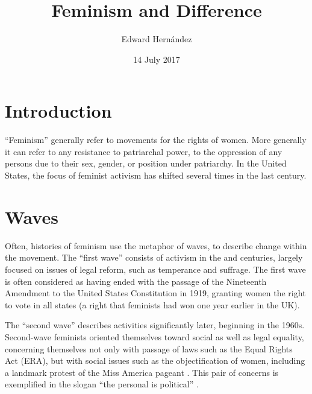 \documentclass[man,12pt,natbib]{apa6}
\begin{document}
\title{Feminism and Difference}
\author{Edward Hern\'{a}ndez}
\date{14 July 2017}
\maketitle

%
%

\section{Introduction}

``Feminism'' generally refer to movements for the rights of women. More
generally it can refer to any resistance to patriarchal power, to the
oppression of any persons due to their sex, gender, or position under
patriarchy. In the United States, the focus of feminist activism has shifted
several times in the last century.

\section{Waves}

Often, histories of feminism use the metaphor of waves, to describe change
within the movement. The ``first wave'' consists of activism in the 
and  centuries, largely focused on issues of legal reform, such as
temperance and suffrage. The first wave is often considered as having ended
with the passage of the Nineteenth Amendment to the United States Constitution
in 1919, granting women the right to vote in all states (a right that feminists
had won one year earlier in the UK).

The ``second wave'' describes activities significantly later, beginning in the
1960s. Second-wave feminists oriented themselves toward social as well as legal
equality, concerning themselves not only with passage of laws such as the Equal
Rights Act (ERA), but with social issues such as the objectification of women,
including a landmark protest of the Miss America pageant \citep{Morgan69}.
This pair of concerns is exemplified in the slogan ``the personal is
political'' \citep{Hanisch70,CombaheeRiverCollective77,Lorde84}.
\end{document}
